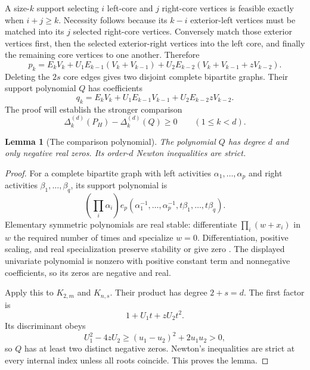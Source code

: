 \documentclass[11pt,a4paper]{article}
\newtheorem{lemma}[theorem]{Lemma}
\theoremstyle{remark}\newtheorem{remark}[theorem]{Remark}
\newcommand{\gap}{\Delta}                  %
\begin{document}
A size-$k$ support selecting $i$ left-core and $j$ right-core vertices is feasible exactly when $i+j\ge k$. Necessity follows because its $k-i$ exterior-left vertices must be matched into its $j$ selected right-core vertices. Conversely match those exterior vertices first, then the selected exterior-right vertices into the left core, and finally the remaining core vertices to one another. Therefore
\begin{equation}\label{mrn:w:fh:eq:coeff}
 p_k=E_kV_k+U_1E_{k-1}(V_k+V_{k-1})
      +U_2E_{k-2}(V_k+V_{k-1}+zV_{k-2}).
\end{equation}
Deleting the $2s$ core edges gives two disjoint complete bipartite graphs. Their support polynomial $Q$ has coefficients
\begin{equation}\label{mrn:w:fh:eq:basecoeff}
 q_k=E_kV_k+U_1E_{k-1}V_{k-1}+U_2E_{k-2}zV_{k-2}.
\end{equation}
The proof will establish the stronger comparison
\begin{equation}\label{mrn:w:fh:eq:increment}
 \gap_k^{(d)}(P_H)-\gap_k^{(d)}(Q)\ge0
 \qquad(1\le k<d).
\end{equation}

\begin{lemma}[The comparison polynomial]\label{mrn:w:fh:lem:Q}
The polynomial $Q$ has degree $d$ and only negative real zeros. Its order-$d$ Newton inequalities are strict.
\end{lemma}
\begin{proof}
For a complete bipartite graph with left activities $\alpha_1,\ldots,\alpha_p$ and right activities $\beta_1,\ldots,\beta_q$, its support polynomial is
\[
 \left(\prod_i\alpha_i\right)
 e_p(\alpha_1^{-1},\ldots,\alpha_p^{-1},t\beta_1,\ldots,t\beta_q).
\]
Elementary symmetric polynomials are real stable: differentiate $\prod_i(w+x_i)$ in $w$ the required number of times and specialize $w=0$. Differentiation, positive scaling, and real specialization preserve stability or give zero \cite{b:COSW}. The displayed univariate polynomial is nonzero with positive constant term and nonnegative coefficients, so its zeros are negative and real.

Apply this to $K_{2,m}$ and $K_{n,s}$. Their product has degree $2+s=d$. The first factor is
\[
 1+U_1t+zU_2t^2.
\]
Its discriminant obeys
\[
 U_1^2-4zU_2\ge(u_1-u_2)^2+2u_1u_2>0,
\]
so $Q$ has at least two distinct negative zeros. Newton's inequalities are strict at every internal index unless all roots coincide. This proves the lemma.
\end{proof}
\end{document}
